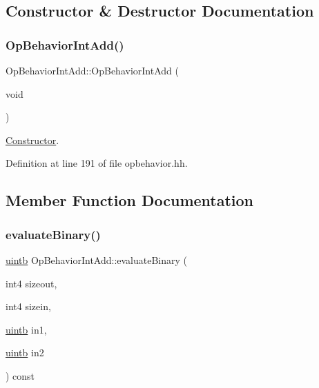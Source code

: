 \subsection{Constructor \& Destructor Documentation}
\mbox{\label{class_op_behavior_int_add_a169b6b899d6651d77ffd9a6e39aa077b}} 
\subsubsection{\texorpdfstring{OpBehaviorIntAdd()}{OpBehaviorIntAdd()}}
{\footnotesize\ttfamily Op\+Behavior\+Int\+Add\+::\+Op\+Behavior\+Int\+Add (\begin{DoxyParamCaption}\item[{void}]{ }\end{DoxyParamCaption})\hspace{0.3cm}{\ttfamily [inline]}}



\mbox{\hyperlink{class_constructor}{Constructor}}. 



Definition at line 191 of file opbehavior.\+hh.



\subsection{Member Function Documentation}
\mbox{\label{class_op_behavior_int_add_a389677fec86e520d3d30635a66170c83}} 
\subsubsection{\texorpdfstring{evaluateBinary()}{evaluateBinary()}}
{\footnotesize\ttfamily \mbox{\hyperlink{types_8h_a2db313c5d32a12b01d26ac9b3bca178f}{uintb}} Op\+Behavior\+Int\+Add\+::evaluate\+Binary (\begin{DoxyParamCaption}\item[{int4}]{sizeout,  }\item[{int4}]{sizein,  }\item[{\mbox{\hyperlink{types_8h_a2db313c5d32a12b01d26ac9b3bca178f}{uintb}}}]{in1,  }\item[{\mbox{\hyperlink{types_8h_a2db313c5d32a12b01d26ac9b3bca178f}{uintb}}}]{in2 }\end{DoxyParamCaption}) const\hspace{0.3cm}{\ttfamily [virtual]}}



